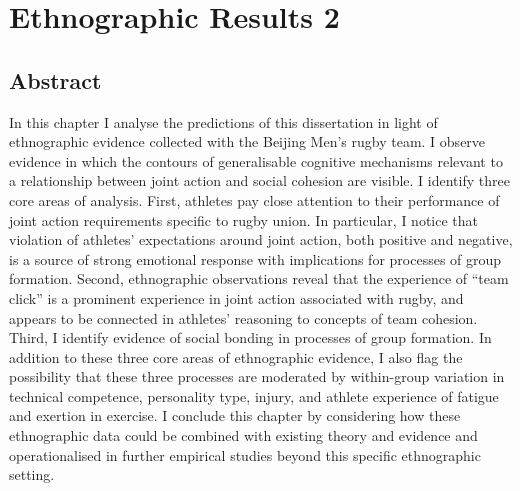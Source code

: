 \chapter{\label{5ethnographicResults}Ethnographic Results 2}

\minitoc



\section{Abstract}
In this chapter I analyse the predictions of this dissertation in light of ethnographic evidence collected with the Beijing Men's rugby team.  I observe evidence in which the contours of generalisable cognitive mechanisms relevant to a relationship between joint action and social cohesion are visible.  I identify three core areas of analysis.  First, athletes pay close attention to their performance of joint action requirements specific to rugby union.  In particular, I notice that violation of athletes' expectations around joint action, both positive and negative, is a source of strong emotional response with implications for processes of group formation.  Second, ethnographic observations reveal that the experience of ``team click'' is a prominent experience in joint action associated with rugby, and appears to be connected in athletes' reasoning to concepts of team cohesion.  Third, I identify evidence of social bonding in processes of group formation.  In addition to these three core areas of ethnographic evidence, I also flag the possibility that these three processes are moderated by within-group variation in technical competence, personality type, injury, and athlete experience of fatigue and exertion in exercise.  I conclude this chapter by considering how these ethnographic data could be combined with existing theory and evidence and operationalised in further empirical studies beyond this specific ethnographic setting.


